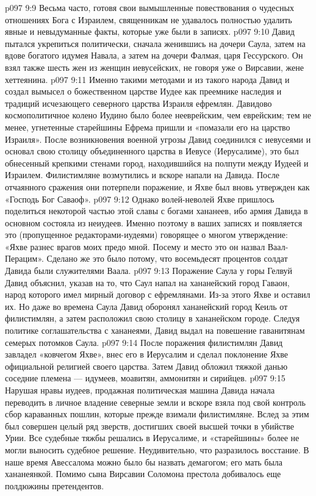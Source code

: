\vs p097 9:9 Весьма часто, готовя свои вымышленные повествования о чудесных отношениях Бога с Израилем, священникам не удавалось полностью удалить явные и невыдуманные факты, которые уже были в записях.
\vs p097 9:10 \pc Давид пытался укрепиться политически, сначала женившись на дочери Саула, затем на вдове богатого идумея Навала, а затем на дочери Фалмая, царя Гессурского. Он взял также шесть жен из женщин иевусейских, не говоря уже о Вирсавии, жене хеттеянина.
\vs p097 9:11 Именно такими методами и из такого народа Давид и создал вымысел о божественном царстве Иудее как преемнике наследия и традиций исчезающего северного царства Израиля ефремлян. Давидово космополитичное колено Иудино было более нееврейским, чем еврейским; тем не менее, угнетенные старейшины Ефрема пришли и «помазали его на царство Израиля». После возникновения военной угрозы Давид соединился с иевусеями и основал свою столицу объединенного царства в Иевусе (Иерусалиме), это был обнесенный крепкими стенами город, находившийся на полпути между Иудеей и Израилем. Филистимляне возмутились и вскоре напали на Давида. После отчаянного сражения они потерпели поражение, и Яхве был вновь утвержден как «Господь Бог Саваоф».
\vs p097 9:12 Однако волей\hyp{}неволей Яхве пришлось поделиться некоторой частью этой славы с богами хананеев, ибо армия Давида в основном состояла из неиудеев. Именно поэтому в ваших записях и появляется это (пропущенное редакторами\hyp{}иудеями) говорящее о многом утверждение: «Яхве разнес врагов моих предо мной. Посему и место это он назвал Ваал\hyp{}Перацим». Сделано же это было потому, что восемьдесят процентов солдат Давида были служителями Ваала.
\vs p097 9:13 Поражение Саула у горы Гелвуй Давид объяснил, указав на то, что Саул напал на хананейский город Гаваон, народ которого имел мирный договор с ефремлянами. Из\hyp{}за этого Яхве и оставил их. Но даже во времена Саула Давид оборонял хананейский город Кеиль от филистимлян, а затем расположил свою столицу в хананейском городе. Следуя политике соглашательства с хананеями, Давид выдал на повешение гаванитянам семерых потомков Саула.
\vs p097 9:14 После поражения филистимлян Давид завладел «ковчегом Яхве», внес его в Иерусалим и сделал поклонение Яхве официальной религией своего царства. Затем Давид обложил тяжкой данью соседние племена --- идумеев, моавитян, аммонитян и сирийцев.
\vs p097 9:15 Нарушая нравы иудеев, продажная политическая машина Давида начала переводить в личное владение северные земли и вскоре взяла под свой контроль сбор караванных пошлин, которые прежде взимали филистимляне. Вслед за этим был совершен целый ряд зверств, достигших своей высшей точки в убийстве Урии. Все судебные тяжбы решались в Иерусалиме, и «старейшины» более не могли выносить судебное решение. Неудивительно, что разразилось восстание. В наше время Авессалома можно было бы назвать демагогом; его мать была хананеянкой. Помимо сына Вирсавии Соломона престола добивалось еще полдюжины претендентов.
